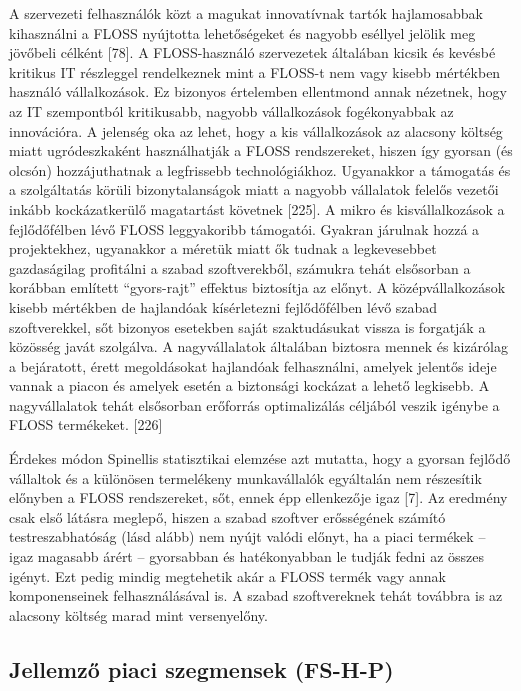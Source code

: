\documentclass[12pt,magyar,a4paper,oneside]{scrreprt}
\begin{document}
A szervezeti felhasználók közt a magukat innovatívnak tartók
hajlamosabbak kihasználni a FLOSS nyújtotta lehetőségeket és nagyobb
eséllyel jelölik meg jövőbeli célként {[}78{]}. A FLOSS-használó
szervezetek általában kicsik és kevésbé kritikus IT részleggel
rendelkeznek mint a FLOSS-t nem vagy kisebb mértékben használó
vállalkozások. Ez bizonyos értelemben ellentmond annak nézetnek, hogy az
IT szempontból kritikusabb, nagyobb vállalkozások fogékonyabbak az
innovációra. A jelenség oka az lehet, hogy a kis vállalkozások az
alacsony költség miatt ugródeszkaként használhatják a FLOSS
rendszereket, hiszen így gyorsan (és olcsón) hozzájuthatnak a
legfrissebb technológiákhoz. Ugyanakkor a támogatás és a szolgáltatás
körüli bizonytalanságok miatt a nagyobb vállalatok felelős vezetői
inkább kockázatkerülő magatartást követnek {[}225{]}. A mikro és
kisvállalkozások a fejlődőfélben lévő FLOSS leggyakoribb támogatói.
Gyakran járulnak hozzá a projektekhez, ugyanakkor a méretük miatt ők
tudnak a legkevesebbet gazdaságilag profitálni a szabad szoftverekből,
számukra tehát elsősorban a korábban említett ``gyors-rajt'' effektus
biztosítja az előnyt. A középvállalkozások kisebb mértékben de
hajlandóak kísérletezni fejlődőfélben lévő szabad szoftverekkel, sőt
bizonyos esetekben saját szaktudásukat vissza is forgatják a közösség
javát szolgálva. A nagyvállalatok általában biztosra mennek és kizárólag
a bejáratott, érett megoldásokat hajlandóak felhasználni, amelyek
jelentős ideje vannak a piacon és amelyek esetén a biztonsági kockázat a
lehető legkisebb. A nagyvállalatok tehát elsősorban erőforrás
optimalizálás céljából veszik igénybe a FLOSS termékeket. {[}226{]}

Érdekes módon Spinellis statisztikai elemzése azt mutatta, hogy a
gyorsan fejlődő vállaltok és a különösen termelékeny munkavállalók
egyáltalán nem részesítik előnyben a FLOSS rendszereket, sőt, ennek épp
ellenkezője igaz {[}7{]}. Az eredmény csak első látásra meglepő, hiszen
a szabad szoftver erősségének számító testreszabhatóság (lásd alább) nem
nyújt valódi előnyt, ha a piaci termékek -- igaz magasabb árért --
gyorsabban és hatékonyabban le tudják fedni az összes igényt. Ezt pedig
mindig megtehetik akár a FLOSS termék vagy annak komponenseinek
felhasználásával is. A szabad szoftvereknek tehát továbbra is az
alacsony költség marad mint versenyelőny.

\hypertarget{sec:FS-H-P}{%
\subsection{Jellemző piaci szegmensek (FS-H-P)}\label{sec:FS-H-P}}
\end{document}
